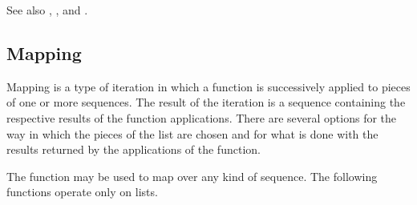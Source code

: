 See also , ,
and .

\subsection{Mapping}

Mapping is a type of iteration in which a function is 
successively applied to pieces of one or more sequences.
The result of the iteration is a sequence containing the respective
results of the function applications.
There are several options for the way in which the pieces of the list are
chosen and for what is done with the results returned by the applications of
the function.

The function  may be used to map over any kind of sequence.
The following functions operate only on lists.

